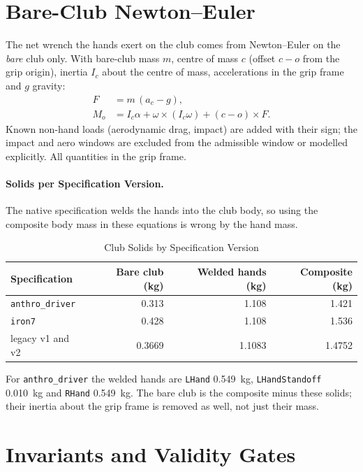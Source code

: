 \documentclass[11pt,a4paper]{article}
\begin{document}
\section{Bare-Club Newton--Euler}
\label{sec:club}

The net wrench the hands exert on the club comes from Newton--Euler on the
\emph{bare} club only.  With bare-club mass $m$, centre of mass $c$ (offset
$c-o$ from the grip origin), inertia $I_c$ about the centre of mass,
accelerations in the grip frame and $g$ gravity:
\begin{align}
F&=m\,(a_c-g),\\
M_o&=I_c\alpha+\omega\times(I_c\omega)+(c-o)\times F .
\end{align}
Known non-hand loads (aerodynamic drag, impact) are added with their sign; the
impact and aero windows are excluded from the admissible window or modelled
explicitly.  All quantities in the grip frame.

\paragraph{Solids per Specification Version.}
The native specification welds the hands into the club body, so using the
composite body mass in these equations is wrong by the hand mass.

\begin{table}[ht]
\centering
\caption{Club Solids by Specification Version}
\label{tab:solids}
\small
\begin{tabular}{@{}lrrr@{}}
\toprule
Specification & Bare club (kg) & Welded hands (kg) & Composite (kg) \\
\midrule
\texttt{anthro\_driver} & 0.313 & 1.108 & 1.421 \\
\texttt{iron7}           & 0.428 & 1.108 & 1.536 \\
legacy v1 and v2        & 0.3669 & 1.1083 & 1.4752 \\
\bottomrule
\end{tabular}
\end{table}

For \texttt{anthro\_driver} the welded hands are \texttt{LHand} 0.549~kg,
\texttt{LHandStandoff} 0.010~kg and \texttt{RHand} 0.549~kg.  The bare club is
the composite minus these solids; their inertia about the grip frame is removed
as well, not just their mass.

\section{Invariants and Validity Gates}
\label{sec:gates}
\end{document}
